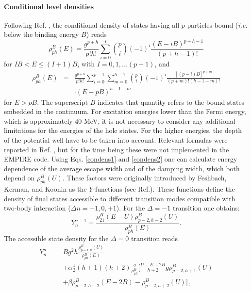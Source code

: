 \documentclass[twocolumn,amsmath,amssymb,10pt,groupedaddress,a4paper]{revtex4}
\begin{document}
\paragraph{Conditional level densities}
Following Ref. \cite{Stan}, the conditional density of states having
all $p$ particles bound ({\it i.e.} below the binding energy $B$) reads
\noindent \begin{equation}
\rho_{ph}^{B}(E)=\frac{g^{p+h}}{p!h!}\sum_{i=0}^{I}{{p \choose i}}(-1)^{i}\frac{(E-iB)^{p+h-1}}{(p+h-1)!}
\label{condens1}
\end{equation}
for $IB<E\leq(I+1)B$, with $I=0,1,...(p-1)$, and
\begin{eqnarray}
\rho_{ph}^{B}(E)&=&\frac{g^{p+h}}{p!h!}\sum_{i=0}^{p-1}\sum_{m=0}^{h-1}{{p \choose i}}(-1)^{i}\frac{[(p-i)B]^{p+m}}{(p+m)!(h-1-m)!}
\nonumber\\
&&\cdot(E-pB)^{h-1-m}
\label{condens2}
\end{eqnarray}
for $E>pB$. The superscript $B$ indicates that quantity refers to
the bound states embedded in the continuum. For excitation energies
lower than the Fermi energy, which is approximately 40 MeV, it is
not necessary to consider any additional limitations for the energies
of the hole states. For the higher energies, the depth of the potential
well have to be taken into account. Relevant formulas were reported
in Ref. \cite{Oblo}, but for the time being these were not implemented
in the EMPIRE code.
Using Eqs. \ref{condens1} and \ref{condens2} one can calculate energy
dependence of the average escape width and of the damping width, which
both depend on $\rho_{ph}^{B}(U)$. These factors were originally
introduced by Feshbach, Kerman, and Koonin as the $Y$-functions
(see Ref.\cite{FKK}).
These functions define the density of final
states accessible to different transition modes compatible with two-body
interaction ($\Delta n=-1,0,+1$). For the $\Delta=-1$ transition
one obtains:
\begin{equation}
Y_{n}^{n-1}=\frac{\rho_{21}^{B}(E-U)\rho_{p-2,h-2}^{B}(U)}{\rho_{ph}^{B}(E)}.
\label{Yminus}
\end{equation}
The accessible state density for the $\Delta=0$ transition reads
\begin{eqnarray}
Y_{n}^{n}  &= & Bg^{2}h\frac{\rho_{p-1,h}^{B}(U)}{\rho_{ph}^{B}(E)}\nonumber \\
 &  & +\alpha\frac{1}{2}(h+1)(h+2)\frac{g}{\rho_{ph}^{B}}\biggl[\frac{U-E+2B}{h+2}g\rho_{p-2,h+1}^{B}(U)\label{Yzero}\nonumber\\
 &  & +\beta\rho_{p-2,h+2}^{B}(E-2B)-\rho_{p-2,h+2}^{B}(U)\biggr]\,,
\end{eqnarray}
\end{document}

